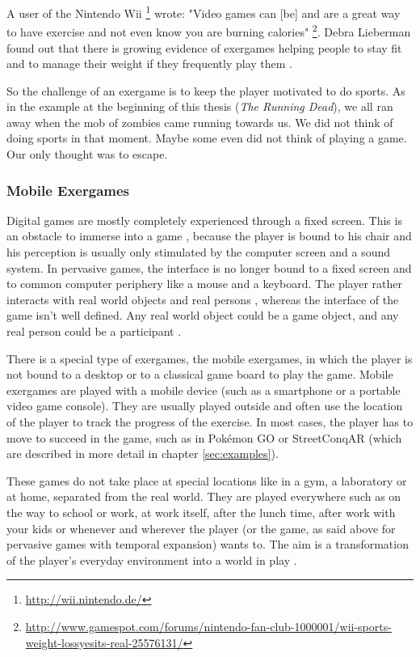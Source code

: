 A user of the Nintendo Wii \footnote{\url{http://wii.nintendo.de/}} wrote: "Video games can [be] and are a great way to have exercise and not even know you are burning calories" \footnote{\url{http://www.gamespot.com/forums/nintendo-fan-club-1000001/wii-sports-weight-lossyesits-real-25576131/}}. Debra Lieberman found out that there is growing evidence of exergames helping people to stay fit and to manage their weight if they frequently play them \citep{Lieberman06dancegames}.

So the challenge of an exergame is to keep the player motivated to do sports. As in the example at the beginning of this thesis (\emph{The Running Dead}), we all ran away when the mob of zombies came running towards us. We did not think of doing sports in that moment. Maybe some even did not think of playing a game. Our only thought was to escape.

\subsubsection{Mobile Exergames}
Digital games are mostly completely experienced through a fixed screen. This is an obstacle to immerse into a game \citep{cheok2002touch}, because the player is bound to his chair and his perception is usually only stimulated by the computer screen and a sound system. In pervasive games, the interface is no longer bound to a fixed screen and to common computer periphery like a mouse and a keyboard. The player rather interacts with real world objects and real persons \citep{nieuwdorp2009pervasive}, whereas the interface of the game isn't well defined. Any real world object could be a game object, and any real person could be a participant \citep{montola2005exploring}.

There is a special type of exergames, the mobile exergames, in which the player is not bound to a desktop or to a classical game board to play the game. Mobile exergames are played with a mobile device (such as a smartphone or a portable video game console). They are usually played outside and often use the location of the player to track the progress of the exercise. In most cases, the player has to move to succeed in the game, such as in Pok\'{e}mon GO or StreetConqAR (which are described in more detail in chapter \ref{sec:examples}).

These games do not take place at special locations like in a gym, a laboratory or at home, separated from the real world. They are played everywhere such as on the way to school or work, at work itself, after the lunch time, after work with your kids or whenever and wherever the player (or the game, as said above for pervasive games with temporal expansion) wants to. The aim is a transformation of the player's everyday environment into a world in play \citep{nieuwdorp2009pervasive}.


